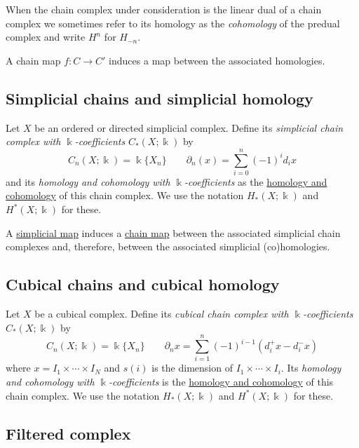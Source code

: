 \documentclass{amsart}
\begin{document}
	When the chain complex under consideration is the linear dual of a chain complex we sometimes refer to its homology as the \textit{cohomology} of the predual complex and write $H^n$ for $H_{-n}$.
	
	A chain map $f : C \to C'$ induces a map between the associated homologies.
	
	\subsection*{Simplicial chains and simplicial homology} \label{simplicial chains and simplicial homology}
	
	Let $X$ be an ordered or directed simplicial complex. Define its \textit{simplicial chain complex with $\Bbbk$-coefficients} $C_*(X; \Bbbk)$ by 
	\begin{equation*}
	C_n(X; \Bbbk) = \Bbbk\{X_n\} \qquad \partial_n(x) = \sum_{i=0}^{n} (-1)^i d_ix
	\end{equation*}
	and its \textit{homology and cohomology with $\Bbbk$-coefficients} as the \hyperref[homology and cohomology]{homology and cohomology} of this chain complex. We use the notation $H_*(X; \Bbbk)$ and $H^*(X; \Bbbk)$ for these.
	
	A \hyperref[abstract simplicial complex]{simplicial map} induces a \hyperref[chain complex]{chain map} between the associated simplicial chain complexes and, therefore, between the associated simplicial (co)homologies.
	
	\subsection*{Cubical chains and cubical homology} \label{cubical chains and cubical homology}
	
	Let $X$ be a cubical complex. Define its \textit{cubical chain complex with $\Bbbk$-coefficients} $C_*(X; \Bbbk)$ by 
	\begin{equation*}
	C_n(X; \Bbbk) = \Bbbk\{X_n\} \qquad \partial_n x = \sum_{i = 1}^{n} (-1)^{i-1}(d^+_i x - d^-_i x)
	\end{equation*}
	where $x = I_1 \times \cdots \times I_N$ and $s(i)$ is the dimension of $I_1 \times \cdots \times I_i$.
	Its \textit{homology and cohomology with $\Bbbk$-coefficients} is the \hyperref[homology and cohomology]{homology and cohomology} of this chain complex. We use the notation $H_*(X; \Bbbk)$ and $H^*(X; \Bbbk)$ for these.
	
	\subsection*{Filtered complex} \label{filtered complex}
	
\end{document}
